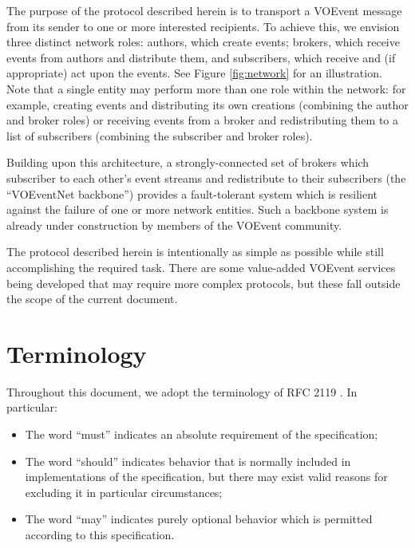 \documentclass[a4paper,11pt]{ivoa}
\begin{document}
The purpose of the protocol described herein is to transport a VOEvent message
from its sender to one or more interested recipients. To achieve this, we
envision three distinct network roles: authors, which create events; brokers,
which receive events from authors and distribute them, and subscribers, which
receive and (if appropriate) act upon the events. See Figure \ref{fig:network}
for an illustration. Note that a single entity may perform more than one role
within the network: for example, creating events and distributing its own
creations (combining the author and broker roles) or receiving events from a
broker and redistributing them to a list of subscribers (combining the
subscriber and broker roles).

Building upon this architecture, a strongly-connected set of brokers which
subscriber to each other's event streams and redistribute to their subscribers
(the ``VOEventNet backbone'') provides a fault-tolerant system which is
resilient against the failure of one or more network entities. Such a backbone
system is already under construction by members of the VOEvent community.

The protocol described herein is intentionally as simple as possible while
still accomplishing the required task. There are some value-added VOEvent
services being developed that may require more complex protocols, but these
fall outside the scope of the current document.

\section{Terminology}

Throughout this document, we adopt the terminology of RFC 2119
\citep{Bradner:1997}. In particular:

\begin{itemize}
    \item{The word ``must'' indicates an absolute requirement of the
    specification;}

    \item{The word ``should'' indicates behavior that is normally included in
    implementations of the specification, but there may exist valid reasons
    for excluding it in particular circumstances;}

    \item{The word ``may'' indicates purely optional behavior which is
    permitted according to this specification.}
\end{itemize}
\end{document}

